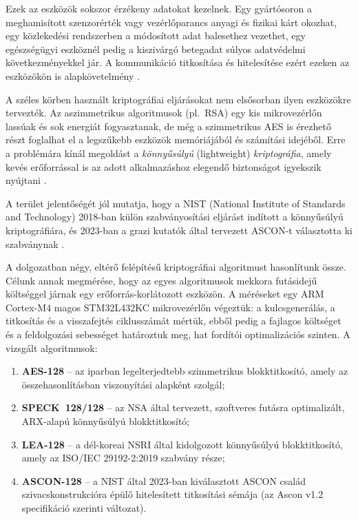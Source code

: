 \documentclass[a4paper,12pt]{report}
\theoremstyle{definition}
\theoremstyle{remark}
\begin{document}
Ezek az eszközök sokszor érzékeny adatokat kezelnek. Egy gyártósoron a meghamisított szenzorérték vagy vezérlőparancs anyagi és fizikai kárt okozhat, egy közlekedési rendszerben a módosított adat balesethez vezethet, egy egészségügyi eszköznél pedig a kiszivárgó betegadat súlyos adatvédelmi következményekkel jár. A kommunikáció titkosítása és hitelesítése ezért ezeken az eszközökön is alapkövetelmény \cite{Hossain2015}.

A széles körben használt kriptográfiai eljárásokat nem elsősorban ilyen eszközökre tervezték. Az aszimmetrikus algoritmusok (pl.~RSA) egy kis mikrovezérlőn lassúak és sok energiát fogyasztanak, de még a szimmetrikus AES is érezhető részt foglalhat el a legszűkebb eszközök memóriájából és számítási idejéből. Erre a problémára kínál megoldást a \emph{könnyűsúlyú} (lightweight) \emph{kriptográfia}, amely kevés erőforrással is az adott alkalmazáshoz elegendő biztonságot igyekszik nyújtani \cite{NISTIR8114}.

A terület jelentőségét jól mutatja, hogy a NIST (National Institute of Standards and Technology) 2018-ban külön szabványosítási eljárást indított a könnyűsúlyú kriptográfiára, és 2023-ban a grazi kutatók által tervezett ASCON-t választotta ki szabványnak \cite{NISTLWC2023}.

\bigskip

A dolgozatban négy, eltérő felépítésű kriptográfiai algoritmust hasonlítunk össze. Célunk annak megmérése, hogy az egyes algoritmusok mekkora futásidejű költséggel járnak egy erőforrás-korlátozott eszközön. A méréseket egy ARM Cortex-M4 magos STM32L432KC mikrovezérlőn végeztük: a kulcsgenerálás, a titkosítás és a visszafejtés ciklusszámát mértük, ebből pedig a fajlagos költséget és a feldolgozási sebességet határoztuk meg, hat fordítói optimalizációs szinten. A vizsgált algoritmusok:

\begin{enumerate}
	\item \textbf{AES-128} -- az iparban legelterjedtebb szimmetrikus blokktitkosító, amely az összehasonlításban viszonyítási alapként szolgál;
	\item \textbf{SPECK~128/128} -- az NSA által tervezett, szoftveres futásra optimalizált, ARX-alapú könnyűsúlyú blokktitkosító;
	\item \textbf{LEA-128} -- a dél-koreai NSRI által kidolgozott könnyűsúlyú blokktitkosító, amely az ISO/IEC 29192-2:2019 szabvány része;
	\item \textbf{ASCON-128} -- a NIST által 2023-ban kiválasztott ASCON család szivacskonstrukcióra épülő hitelesített titkosítási sémája (az Ascon v1.2 specifikáció szerinti változat).
\end{enumerate}
\end{document}
